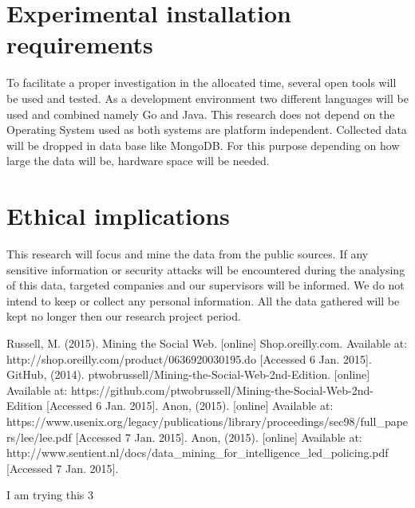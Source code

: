 \documentclass[12pt]{article}
\begin{document}
\section{Experimental installation requirements}

To facilitate a proper investigation in the allocated time, several open tools will be used and tested. As a development environment two different languages will be used and combined namely Go and Java. This research does not depend on the Operating System used as both systems are platform independent. Collected data will be dropped in data base like MongoDB. For this purpose depending on how large the data will be, hardware space will be needed.

\section{Ethical implications}

This research will focus and mine the data from the public sources. If any sensitive information or security attacks will be encountered during the analysing of this data, targeted companies and our supervisors will be informed. We do not intend to keep or collect any personal information. All the data gathered will be kept no longer then our research project period. 




\begin{thebibliography}{99}
  Russell, M. (2015). Mining the Social Web. [online] Shop.oreilly.com. Available at: http://shop.oreilly.com/product/0636920030195.do [Accessed 6 Jan. 2015].
  GitHub, (2014). ptwobrussell/Mining-the-Social-Web-2nd-Edition. [online] Available at: https://github.com/ptwobrussell/Mining-the-Social-Web-2nd-Edition [Accessed 6 Jan. 2015].
Anon, (2015). [online] Available at: https://www.usenix.org/legacy/publications/library/proceedings/sec98/full\_papers/lee/lee.pdf [Accessed 7 Jan. 2015].
Anon, (2015). [online] Available at: http://www.sentient.nl/docs/data\_mining\_for\_intelligence\_led\_policing.pdf [Accessed 7 Jan. 2015].

  I am trying this 3
\end{thebibliography}
\end{document}
